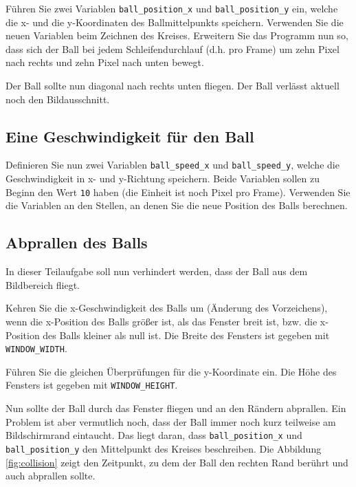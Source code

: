 \documentclass[
]{scrartcl}
\begin{document}
 Führen Sie zwei Variablen \texttt{ball\_position\_x} und
\texttt{ball\_position\_y} ein, welche die x- und die y-Koordinaten des
Ballmittelpunkts speichern. Verwenden Sie die neuen Variablen beim
Zeichnen des Kreises. Erweitern Sie das Programm nun so, dass sich der
Ball bei jedem Schleifendurchlauf (d.h. pro Frame) um zehn Pixel nach
rechts und zehn Pixel nach unten bewegt.

Der Ball sollte nun diagonal nach rechts unten fliegen. Der Ball
verlässt aktuell noch den Bildausschnitt.

\hypertarget{eine-geschwindigkeit-fuxfcr-den-ball}{%
\subsection{Eine Geschwindigkeit für den
Ball}\label{eine-geschwindigkeit-fuxfcr-den-ball}}

 Definieren Sie nun zwei Variablen \texttt{ball\_speed\_x}
und \texttt{ball\_speed\_y}, welche die Geschwindigkeit in x- und
y-Richtung speichern. Beide Variablen sollen zu Beginn den Wert
\texttt{10} haben (die Einheit ist noch Pixel pro Frame). Verwenden Sie
die Variablen an den Stellen, an denen Sie die neue Position des Balls
berechnen.

\hypertarget{abprallen-des-balls}{%
\subsection{Abprallen des Balls}\label{abprallen-des-balls}}

In dieser Teilaufgabe soll nun verhindert werden, dass der Ball aus dem
Bildbereich fliegt.

 Kehren Sie die x-Geschwindigkeit des Balls um (Änderung
des Vorzeichens), wenn die x-Position des Balls größer ist, als das
Fenster breit ist, bzw. die x-Position des Balls kleiner als null ist.
Die Breite des Fensters ist gegeben mit \texttt{WINDOW\_WIDTH}.

 Führen Sie die gleichen Überprüfungen für die y-Koordinate
ein. Die Höhe des Fensters ist gegeben mit \texttt{WINDOW\_HEIGHT}.

Nun sollte der Ball durch das Fenster fliegen und an den Rändern
abprallen. Ein Problem ist aber vermutlich noch, dass der Ball immer
noch kurz teilweise am Bildschirmrand eintaucht. Das liegt daran, dass
\texttt{ball\_position\_x} und \texttt{ball\_position\_y} den
Mittelpunkt des Kreises beschreiben. Die Abbildung \ref{fig:collision}
zeigt den Zeitpunkt, zu dem der Ball den rechten Rand berührt und auch
abprallen sollte.
\end{document}

